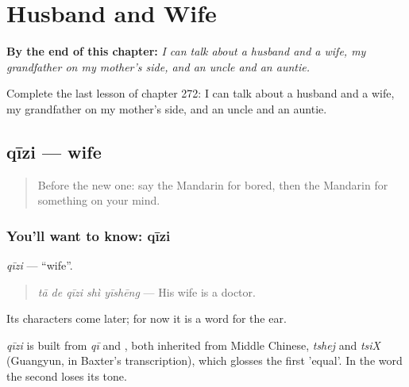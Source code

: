 
\chapter{Husband and Wife}
\label{ch:zh-husband-and-wife}

\begin{chapteropening}
\textbf{By the end of this chapter:} \emph{I can talk about a husband and a wife, my grandfather on my mother's side, and an uncle and an auntie.}

Complete the last lesson of chapter 272: I can talk about a husband and a wife, my grandfather on my mother's side, and an uncle and an auntie.
\end{chapteropening}

\section[qīzi]{qīzi — wife}

\label{lesson:ZH-C272-qizi}



\begin{quote}
Before the new one: say the Mandarin for bored, then the Mandarin for something on your mind.
\end{quote}

\subsection*{You'll want to know: qīzi}
\emph{qīzi} — \textquotedblleft{}wife\textquotedblright{}.

\begin{quote}
\emph{tā de qīzi shì yīshēng} — His wife is a doctor.
\end{quote}

Its characters come later; for now it is a word for the ear.

\begin{cousinweb}
\emph{qīzi} is built from \emph{qī} and , both inherited from Middle Chinese, \emph{tshej} and \emph{tsiX} (Guangyun, in Baxter's transcription), which glosses the first 'equal'. In the word the second loses its tone.
\end{cousinweb}

